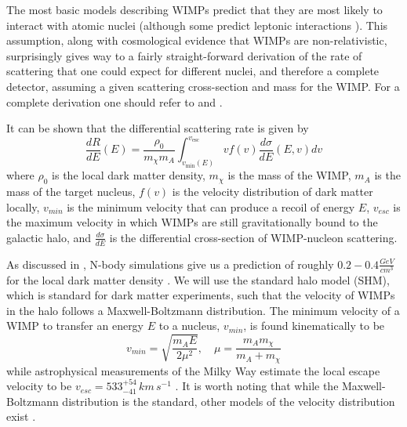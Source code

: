 The most basic models describing WIMPs predict that they are most likely to interact with atomic nuclei (although some predict leptonic interactions \cite{kopp2009dama}).  This assumption, along with cosmological evidence that WIMPs are non-relativistic, surprisingly gives way to a fairly straight-forward derivation of the rate of scattering that one could expect for different nuclei, and therefore a complete detector, assuming a given scattering cross-section and mass for the WIMP.  For a complete derivation one should refer to  and .

It can be shown that the differential scattering rate is given by \cite{undagoitia2015dark}
%
\begin{equation}
        \frac{dR}{dE}(E) = \frac{\rho_0}{m_{\chi} m_{A}} \int_{v_{\textrm{min}}(E)}^{v_{\textrm{esc}}} v f(v) \frac{d\sigma}{dE}(E, v) dv
\end{equation} 
%
where $\rho_0$ is the local dark matter density, $m_{\chi}$ is the mass of the WIMP, $m_{A}$ is the mass of the target nucleus, $f(v)$ is the velocity distribution of dark matter locally, $v_{min}$ is the minimum velocity that can produce a recoil of energy $E$, $v_{esc}$ is the maximum velocity in which WIMPs are still gravitationally bound to the galactic halo, and $\frac{d\sigma}{dE}$ is the differential cross-section of WIMP-nucleon scattering.  

As discussed in , N-body simulations give us a prediction of roughly $0.2 - 0.4 \frac{GeV}{cm^3}$ for the local dark matter density \cite{read2014local}.  We will use the standard halo model (SHM), which is standard for dark matter experiments,  such that the velocity of WIMPs in the halo follows a Maxwell-Boltzmann distribution.  The minimum velocity of a WIMP to transfer an energy $E$ to a nucleus, $v_{min}$, is found kinematically to be 
%
\begin{equation}
        v_{min} = \sqrt{\frac{m_A E}{2 \mu^2}},  \quad
        \mu = \frac{m_A m_{\chi}}{m_A + m_{\chi}}
\end{equation}
%
while astrophysical measurements of the Milky Way estimate the local escape velocity to be $v_{esc} = 533^{+54}_{-41} \, km \, s^{-1}$ \cite{piffl2014rave}.  It is worth noting that while the Maxwell-Boltzmann distribution is the standard, other models of the velocity distribution exist \cite{kuhlen2010dark}.

